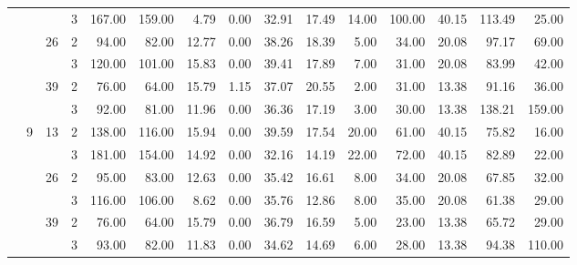 \begin{tabular}{llllrrrrrrrrrrr}
               &   &    & 3 &   167.00 &    159.00 &  4.79 &    0.00 &   32.91 &   17.49 &   14.00 &  100.00 &   40.15 & 113.49 &    25.00 \\
\cline{3-15}
               &   & \multirow{2}{*}{26} & 2 &    94.00 &     82.00 & 12.77 &    0.00 &   38.26 &   18.39 &    5.00 &   34.00 &   20.08 &  97.17 &    69.00 \\
               &   &    & 3 &   120.00 &    101.00 & 15.83 &    0.00 &   39.41 &   17.89 &    7.00 &   31.00 &   20.08 &  83.99 &    42.00 \\
\cline{3-15}
               &   & \multirow{2}{*}{39} & 2 &    76.00 &     64.00 & 15.79 &    1.15 &   37.07 &   20.55 &    2.00 &   31.00 &   13.38 &  91.16 &    36.00 \\
               &   &    & 3 &    92.00 &     81.00 & 11.96 &    0.00 &   36.36 &   17.19 &    3.00 &   30.00 &   13.38 & 138.21 &   159.00 \\
\cline{2-15}
\cline{3-15}
               & \multirow{6}{*}{9} & \multirow{2}{*}{13} & 2 &   138.00 &    116.00 & 15.94 &    0.00 &   39.59 &   17.54 &   20.00 &   61.00 &   40.15 &  75.82 &    16.00 \\
               &   &    & 3 &   181.00 &    154.00 & 14.92 &    0.00 &   32.16 &   14.19 &   22.00 &   72.00 &   40.15 &  82.89 &    22.00 \\
\cline{3-15}
               &   & \multirow{2}{*}{26} & 2 &    95.00 &     83.00 & 12.63 &    0.00 &   35.42 &   16.61 &    8.00 &   34.00 &   20.08 &  67.85 &    32.00 \\
               &   &    & 3 &   116.00 &    106.00 &  8.62 &    0.00 &   35.76 &   12.86 &    8.00 &   35.00 &   20.08 &  61.38 &    29.00 \\
\cline{3-15}
               &   & \multirow{2}{*}{39} & 2 &    76.00 &     64.00 & 15.79 &    0.00 &   36.79 &   16.59 &    5.00 &   23.00 &   13.38 &  65.72 &    29.00 \\
               &   &    & 3 &    93.00 &     82.00 & 11.83 &    0.00 &   34.62 &   14.69 &    6.00 &   28.00 &   13.38 &  94.38 &   110.00 \\
\bottomrule
\end{tabular}
